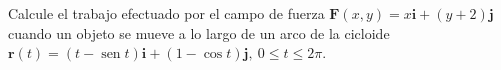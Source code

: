 \item Calcule el trabajo efectuado por el campo de fuerza $\mathbf{F}(x, y) = x \mathbf{i} + (y + 2) \mathbf{j}$ cuando un objeto se mueve a lo largo de un arco de la cicloide $\mathbf{r}(t) = (t - \operatorname{sen} t) \mathbf{i} + (1 - \cos t) \mathbf{j}, \ 0 \le t \le 2\pi$.
